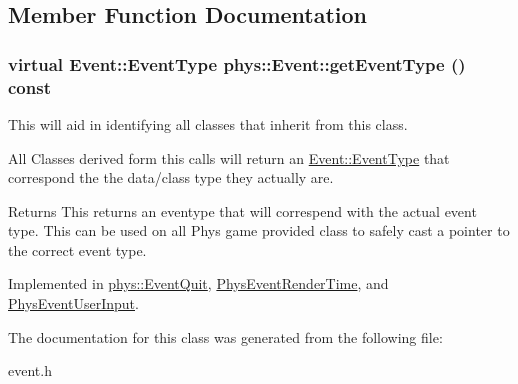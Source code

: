 \subsection{Member Function Documentation}
\hypertarget{classphys_1_1Event_ac2c0623a6bc399e62f4b9fb2c022ea73}{
\subsubsection[{getEventType}]{\setlength{\rightskip}{0pt plus 5cm}virtual {\bf Event::EventType} phys::Event::getEventType () const}}
\label{d5/dcb/classphys_1_1Event_ac2c0623a6bc399e62f4b9fb2c022ea73}


This will aid in identifying all classes that inherit from this class. 

All Classes derived form this calls will return an \hyperlink{classphys_1_1Event_af5fdbb3e08d8e578d58770fbc606fda7}{Event::EventType} that correspond the the data/class type they actually are. \begin{DoxyReturn}{Returns}
This returns an eventype that will correspend with the actual event type. This can be used on all Phys game provided class to safely cast a pointer to the correct event type. 
\end{DoxyReturn}


Implemented in \hyperlink{classphys_1_1EventQuit_a4df44098d0ef838db55a8e2a016d0724}{phys::EventQuit}, \hyperlink{classPhysEventRenderTime_a96b0569f8b1cd459383318c9437130d4}{PhysEventRenderTime}, and \hyperlink{classPhysEventUserInput_a2a39643cd222f7af0db7b087e0441582}{PhysEventUserInput}.



The documentation for this class was generated from the following file:\begin{DoxyCompactItemize}
\item 
event.h\end{DoxyCompactItemize}

